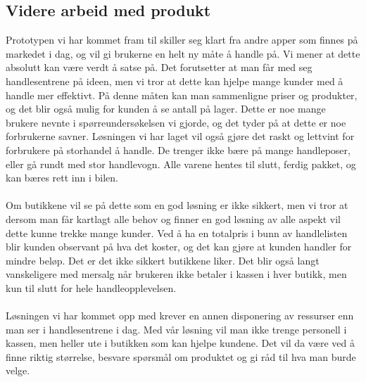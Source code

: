 \subsection{Videre arbeid med produkt}
Prototypen vi har kommet fram til skiller seg klart fra andre apper som finnes på markedet i dag, og vil gi brukerne en helt ny måte å handle på. Vi mener at dette absolutt kan være verdt å satse på. Det forutsetter at man får med seg handlesentrene på ideen, men vi tror at dette kan hjelpe mange kunder med å handle mer effektivt. På denne måten kan man sammenligne priser og produkter, og det blir også mulig for kunden å se antall på lager. Dette er noe mange brukere nevnte i spørreundersøkelsen vi gjorde, og det tyder på at dette er noe forbrukerne savner. Løsningen vi har laget vil også gjøre det raskt og lettvint for forbrukere på storhandel å handle. De trenger ikke bære på mange handleposer, eller gå rundt med stor handlevogn. Alle varene hentes til slutt, ferdig pakket, og kan bæres rett inn i bilen.
\\\\
Om butikkene vil se på dette som en god løsning er ikke sikkert, men vi tror at dersom man får kartlagt alle behov og finner en god løsning av alle aspekt vil dette kunne trekke mange kunder. Ved å ha en totalpris i bunn av handlelisten blir kunden observant på hva det koster, og det kan gjøre at kunden handler for mindre beløp. Det er det ikke sikkert butikkene liker. Det blir også langt vanskeligere med mersalg når brukeren ikke betaler i kassen i hver butikk, men kun til slutt for hele handleopplevelsen.
\\\\
Løsningen vi har kommet opp med krever en annen disponering av ressurser enn man ser i handlesentrene i dag. Med vår løsning vil man ikke trenge personell i kassen, men heller ute i butikken som kan hjelpe kundene. Det vil da være ved å finne riktig størrelse, besvare spørsmål om produktet og gi råd til hva man burde velge. 

